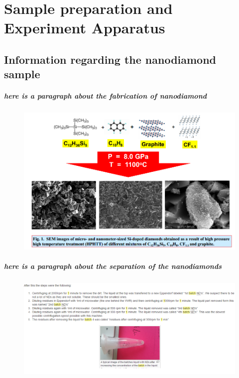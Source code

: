 \chapter[Sample preparation and Experiment Apparatus]{Sample preparation and Experiment Apparatus} %

\label{Chapter2} %

\section{Information regarding the nanodiamond sample}

\paragraph{here is a paragraph about the fabrication of nanodiamond}
\FloatBarrier
\begin{figure}[h]
\centering
\includegraphics[width=0.7\linewidth]{Figures/pic/Unbenannt}
\caption{}
\label{fig:unbenannt}
\end{figure}
\FloatBarrier

\paragraph{here is a paragraph about the separation of the nanodiamonds}
\FloatBarrier
\begin{figure}[h]
\centering
\includegraphics[width=0.7\linewidth]{Figures/pic/Unbenannt1}
\caption{}
\label{fig:unbenannt1}
\end{figure}
\FloatBarrier
